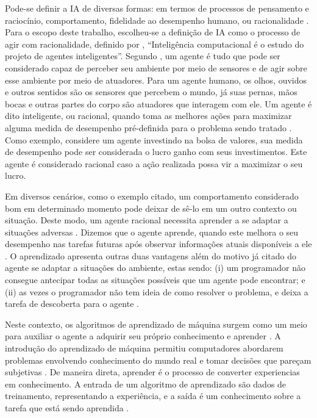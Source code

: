 Pode-se definir a \acrshort{IA} de diversas formas: em termos de processos de pensamento e raciocínio, comportamento, fidelidade ao desempenho humano, ou racionalidade \cite{modern_approach}. Para o escopo deste trabalho, escolheu-se a definição de \acrshort{IA} como o processo de agir com racionalidade, definido por \textcite{poole1998computational}, ``Inteligência computacional é o estudo do projeto de agentes inteligentes''. Segundo \textcite{modern_approach}, um agente é tudo que pode ser considerado capaz de perceber seu ambiente por meio de sensores e de agir sobre esse ambiente por meio de atuadores. Para um agente humano, os olhos, ouvidos e outros sentidos são os sensores que percebem o mundo, já suas pernas, mãos bocas e outras partes do corpo são atuadores que interagem com ele. Um agente é dito inteligente, ou racional, quando toma as melhores ações para maximizar alguma medida de desempenho pré-definida para o problema sendo tratado \cite{modern_approach}. Como exemplo, considere um agente investindo na bolsa de valores, sua medida de desempenho pode ser considerada o lucro ganho com seus investimentos. Este agente é considerado racional caso a ação realizada possa vir a maximizar o seu lucro.

Em diversos cenários, como o exemplo citado, um comportamento considerado bom em determinado momento pode deixar de sê-lo em um outro contexto ou situação. Deste modo, um agente racional necessita aprender a se adaptar a situações adversas \cite{modern_approach}. Dizemos que o agente aprende, quando este melhora o seu desempenho nas tarefas futuras após observar informações atuais disponíveis a ele \cite{modern_approach}. O aprendizado apresenta outras duas vantagens além do motivo já citado do agente se adaptar a situações do ambiente, estas sendo: (i) um programador não consegue antecipar todas as situações possíveis que um agente pode encontrar; e (ii) as vezes o programador não tem ideia de como resolver o problema, e deixa a tarefa de descoberta para o agente \cite{modern_approach}.

Neste contexto, os algoritmos de aprendizado de máquina surgem como um meio para auxiliar o agente a adquirir seu próprio conhecimento e aprender \cite{machinelearning}. A introdução do aprendizado de máquina permitiu computadores abordarem problemas envolvendo conhecimento do mundo real e tomar decisões que pareçam subjetivas \cite{deep_learning}. De maneira direta, aprender é o processo de converter experiencias em conhecimento. A entrada de um algoritmo de aprendizado são dados de treinamento, representando a experiência, e a saída é um conhecimento sobre a tarefa que está sendo aprendida \cite{shalev2014understanding}.


